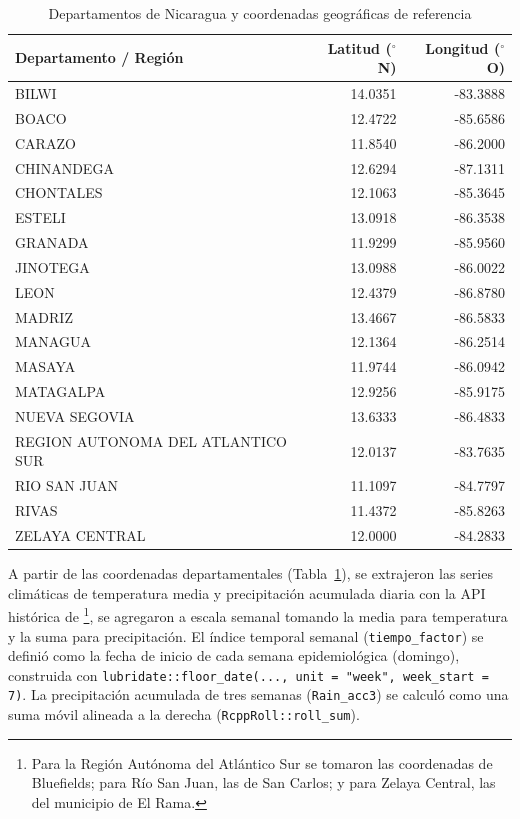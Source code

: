 \documentclass[11pt,a4paper]{article}
\begin{document}
\begin{table}[htbp]
	\centering
	\small
	\caption{Departamentos de Nicaragua y coordenadas geográficas de referencia}
	\label{tab:coords_deptos}
	\begin{tabular}{lrr}
		\toprule
		\textbf{Departamento / Región} & \textbf{Latitud ($^\circ$N)} & \textbf{Longitud ($^\circ$O)} \\
		\midrule
		BILWI & 14.0351 & -83.3888 \\
		BOACO & 12.4722 & -85.6586 \\
		CARAZO & 11.8540 & -86.2000 \\
		CHINANDEGA & 12.6294 & -87.1311 \\
		CHONTALES & 12.1063 & -85.3645 \\
		ESTELI & 13.0918 & -86.3538 \\
		GRANADA & 11.9299 & -85.9560 \\
		JINOTEGA & 13.0988 & -86.0022 \\
		LEON & 12.4379 & -86.8780 \\
		MADRIZ & 13.4667 & -86.5833 \\
		MANAGUA & 12.1364 & -86.2514 \\
		MASAYA & 11.9744 & -86.0942 \\
		MATAGALPA & 12.9256 & -85.9175 \\
		NUEVA SEGOVIA & 13.6333 & -86.4833 \\
		REGION AUTONOMA DEL ATLANTICO SUR & 12.0137 & -83.7635 \\
		RIO SAN JUAN & 11.1097 & -84.7797 \\
		RIVAS & 11.4372 & -85.8263 \\
		ZELAYA CENTRAL & 12.0000 & -84.2833 \\
		\bottomrule
	\end{tabular}
\end{table}

A partir de las coordenadas departamentales (Tabla~\ref{tab:coords_deptos}), se extrajeron las series climáticas de temperatura media y precipitación acumulada diaria con la API histórica de \textcite{openmeteo_historical}\footnote{Para la Región Autónoma del Atlántico Sur se tomaron las coordenadas de Bluefields; para Río San Juan, las de San Carlos; y para Zelaya Central, las del municipio de El Rama.}, se agregaron a escala semanal tomando la media para temperatura y la suma para precipitación. El índice temporal semanal (\texttt{tiempo\_factor}) se definió como la fecha de inicio de cada semana epidemiológica (domingo), construida con \texttt{lubridate::floor\_date(..., unit = "week", week\_start = 7)}. La precipitación acumulada de tres semanas (\texttt{Rain\_acc3}) se calculó como una suma móvil alineada a la derecha (\texttt{RcppRoll::roll\_sum}).
\end{document}
